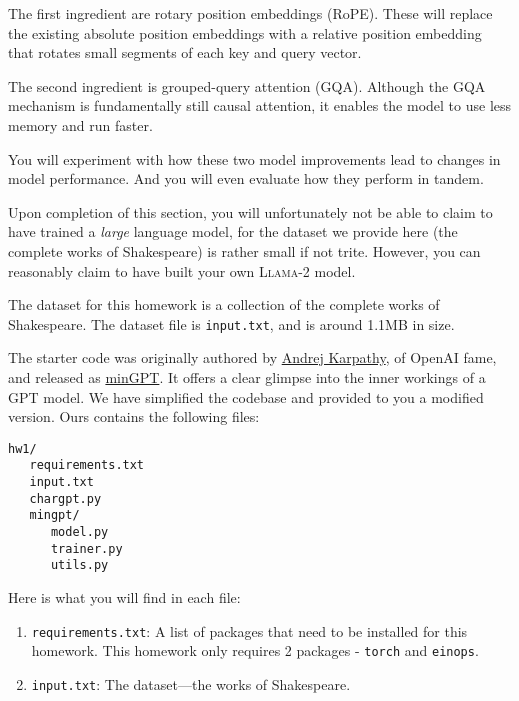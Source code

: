 \documentclass[11pt,addpoints,answers]{exam}
\begin{document}
\begin{questions}
The first ingredient are rotary position embeddings (RoPE). These will replace the existing absolute position embeddings with a relative position embedding that rotates small segments of each key and query vector. 

The second ingredient is grouped-query attention (GQA). Although the GQA mechanism is fundamentally still causal attention, it enables the model to use less memory and run faster. 

You will experiment with how these two model improvements lead to changes in model performance. And you will even evaluate how they perform in tandem.

Upon completion of this section, you will unfortunately not be able to claim to have trained a \emph{large} language model, for the dataset we provide here (the complete works of Shakespeare) is rather small if not trite. However, you can reasonably claim to have built your own \textsc{Llama}-2 model.


 The dataset for this homework is a collection of the complete works of Shakespeare. The dataset file is \lstinline{input.txt}, and is around 1.1MB in size. 

 The starter code was originally authored by \href{https://karpathy.ai/}{Andrej Karpathy}, of OpenAI fame, and released as \href{https://github.com/karpathy/minGPT}{minGPT}. It offers a clear glimpse into the inner workings of a GPT model. We have simplified the codebase and provided to you a modified version. Ours contains the following files:
\begin{verbatim}
hw1/
   requirements.txt
   input.txt
   chargpt.py
   mingpt/
      model.py
      trainer.py
      utils.py
\end{verbatim}
Here is what you will find in each file:
\begin{enumerate}
    
    \item \lstinline{requirements.txt}: A list of packages that need to be installed for this homework. This homework only requires 2 packages - \lstinline{torch} and \lstinline{einops}.
    
    \item \lstinline{input.txt}: The dataset---the works of Shakespeare.
    

\end{enumerate}
\end{questions}
\end{document}
